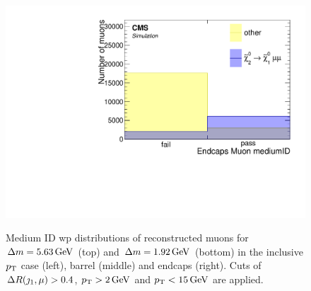 \begin{figure}[!htb]
\includegraphics[width=0.32\linewidth]{plots/lepton_selection/lepton_selection_dm1p92/none_Muons_pt_endcape_medium.pdf} \\
\caption[Medium ID \gls{wp} distribution of reconstructed muons]{Medium ID \gls{wp} distributions of reconstructed muons for $\Delta m=5.63\,\text{Ge\hspace{-.08em}V}$ (top) and $\Delta m=1.92\,\text{Ge\hspace{-.08em}V}$ (bottom) in the inclusive $p_{\mathrm{T}}$ case (left), barrel (middle) and endcaps (right). Cuts of $\Delta R(\jmath_1,\mu)>0.4$, $p_{\mathrm{T}}>2\,\text{Ge\hspace{-.08em}V}$ and $p_{\mathrm{T}}<15\,\text{Ge\hspace{-.08em}V}$ are applied.}
\label{fig:muons-selection-id-medium}
\end{figure}

